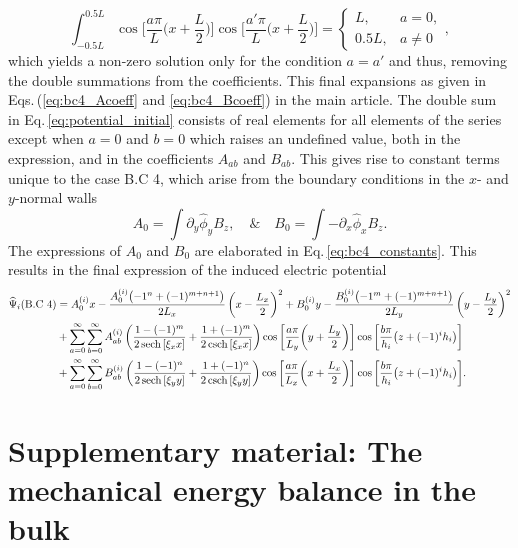 \documentclass[aps,prfluids,reprint,superscriptaddress]{revtex4-2}
\newcommand{\ii}[1]{\text{#1}}
\newcommand{\nn}{\nonumber}
\newcommand{\mref}[1]{{\hypersetup{linkcolor=black}\ref{#1}}}
\newcommand{\meqref}[1]{{\hypersetup{linkcolor=black}\eqref{#1}}}
\numberwithin{equation}{section}
\begin{document}
\begin{equation}
	\int_{-0.5L}^{0.5L}
	\cos{\biggl[ \frac{a\pi}{L}\biggl(x + \frac{L}{2}\biggr)\biggr]}
	\cos{\biggl[ \frac{a'\pi}{L}\biggl(x + \frac{L}{2}\biggr)\biggr]}
	=
	\left\{
	\begin{array}{cc}
		L, & a=0,
		\\
		0.5L, & a\neq 0
	\end{array}
	\right. ,
\end{equation}
which yields a non-zero solution only for the condition $a=a'$ and thus, removing the double summations from the coefficients. This final expansions as given in Eqs.\,(\mref{eq:bc4_Acoeff} and \mref{eq:bc4_Bcoeff}) in the main article. The double sum in Eq.\,\eqref{eq:potential_initial} consists of real elements for all elements of the series except when $a=0$ and $b=0$ which raises an undefined value, both in the expression, and in the coefficients $A_{ab}$ and $B_{ab}$. This gives rise to constant terms unique to the case B.C 4, which arise from the boundary conditions in the $x$- and $y$-normal walls
\begin{equation}
	A_0 = \int \partial_y\widehat\phi_y B_z, \quad \& \quad
	B_0 = \int -\partial_x \widehat\phi_x B_z .
\end{equation}
The expressions of $A_0$ and $B_0$ are elaborated in Eq.\,\meqref{eq:bc4_constants}. This results in the final expression of the induced electric potential
\begin{align}
	\nn
	\widehat\Psi_i (\ii{B.C 4})&= 
	A_0^{(i)}x - \frac{A_0^{(i)} \bigl(-1^n + (-1)^{m+n+1} \bigr) }{2L_x}
	\left(x- \frac{L_x}{2}\right)^2
	+
	B_0^{(i)}y - \frac{B_0^{(i)} \bigl(-1^m + (-1)^{m+n+1} \bigr) }{2L_y}
	\left(y- \frac{L_y}{2}\right)^2
	\\
	\nn
	&+
	\sum_{a=0}^{\infty} \sum_{b=0}^{\infty}
	A^{(i)}_{ab} 
	\left(
	\frac{1-(-1)^m}{2\sech{[\xi_x x]}} + \frac{1+(-1)^m}{2\csch{[\xi_x x]}}
	\right)
	\cos{\biggl[ \frac{a\pi}{L_y}\biggl(y + \frac{L_y}{2}\biggr)\biggr]}
	\cos{\biggl[ \frac{b\pi}{h_i}\bigl(z + (-1)^i h_i\bigr)\biggr]} 
	\\
	&+
	\sum_{a=0}^{\infty} \sum_{b=0}^{\infty}
	B^{(i)}_{ab} 
	\left(
	\frac{1-(-1)^n}{2\sech{[\xi_y y]}} + \frac{1+(-1)^n}{2\csch{[\xi_y y]}}
	\right)
	\cos{\biggl[ \frac{a\pi}{L_x}\biggl(x + \frac{L_x}{2}\biggr)\biggr]}
	\cos{\biggl[ \frac{b\pi}{h_i}\bigl(z + (-1)^i h_i\bigr)\biggr]}
.
\end{align}


\clearpage
\section{Supplementary material: The mechanical energy balance in the bulk} 
\label{supplB}
\end{document}
